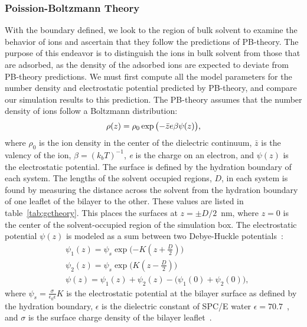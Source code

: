 \documentclass[journal=langd5,manuscript=article]{achemso}
\begin{document}
\subsubsection{Poission-Boltzmann Theory}
With the boundary defined, we look to the region of bulk solvent to examine the behavior of ions and ascertain that
they follow the predictions of PB-theory\cite{israelachvili:2011:intermol}. 
The purpose of this endeavor is to distinguish the ions in bulk solvent from those that are adsorbed,
as the density of the adsorbed ions are expected to deviate from PB-theory predictions.
We must first compute all the model parameters for the number density and electrostatic potential predicted by
PB-theory, and compare our simulation results to this prediction.
The PB-theory assumes 
that the number density of ions follow a Boltzmann distribution:
\begin{equation}
    \rho(z) = \rho_0 \exp\big({- \bar z \text{\si{\elementarycharge}} \beta \psi(z)}\big)\text{,}
    \label{eq:gcnum}
\end{equation}
where $\rho_0$ is the ion density in the center of the dielectric continuum, $\bar z$ is the valency of the ion, 
$\beta = (k_bT)^{-1}$, \si{\elementarycharge} is the charge
on an electron, and $\psi(z)$ is the electrostatic potential. The surface is defined by the hydration boundary of each system. 
The lengths of the solvent occupied regions, $D$, {in each system is} found by measuring the distance across the solvent from the 
hydration boundary of one leaflet of the bilayer to the other. 
These values are listed in table~\ref{tab:gctheory}.
This places the surfaces at $z=\pm D/2$~nm, where $z=0$ is the center of the solvent-occupied region of the simulation box.
The electrostatic potential $\psi(z)$ is modeled as a sum between two Debye-Huckle potentials~\cite{israelachvili:2011:intermol}:
\begin{align}
    &\psi_{1}(z) = \psi_s \exp\bigg({-K(z+\frac{D}{2})}\bigg)\\
    &\psi_{2}(z) = \psi_s \exp\bigg({K(z-\frac{D}{2})}\bigg)\\
    \label{eq:gcpot}
    &\psi(z) = \psi_1(z) + \psi_2(z) - \big({\psi_1(0)+\psi_2(0)}\big)\text{,}
\end{align}
where $\psi_s = \frac{\sigma}{\epsilon_0\epsilon} K$ is the electrostatic potential at the bilayer surface
as defined by the hydration boundary, $\epsilon$ 
is the dielectric constant of SPC/E water $\epsilon=70.7$~\cite{reddy:1989:dielectric}, and $\sigma$
is the surface charge density of the bilayer leaflet~\cite{israelachvili:2011:intermol}. 
\end{document}
